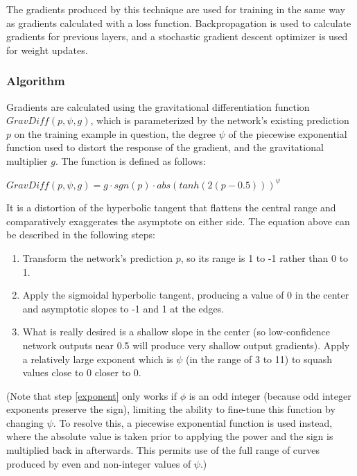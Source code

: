 \documentclass[10pt]{article}
\begin{document}
The gradients produced by this technique are used for training in the same way as gradients calculated with a loss function. Backpropagation is used to calculate gradients for previous layers, and a stochastic gradient descent optimizer \cite{sgd} is used for weight updates.

\subsubsection{Algorithm}

Gradients are calculated using the gravitational differentiation function $GravDiff(p, \psi, g)$, which is parameterized by the network's existing prediction $p$ on the training example in question, the degree $\psi$ of the piecewise exponential function used to distort the response of the gradient, and the gravitational multiplier $g$. The function is defined as follows:

$GravDiff(p, \psi, g) = g \cdot sgn(p) \cdot abs(tanh(2(p - 0.5))) ^ \psi$

It is a distortion of the hyperbolic tangent that flattens the central range and comparatively exaggerates the asymptote on either side. The equation above can be described in the following steps:

\begin{enumerate}
    \item Transform the network's prediction $p$, so its range is 1 to -1 rather than 0 to 1.
    \item Apply the sigmoidal hyperbolic tangent, producing a value of 0 in the center and asymptotic slopes to -1 and 1 at the edges.
    \item \label{exponent} What is really desired is a shallow slope in the center (so low-confidence network outputs near 0.5 will produce very shallow output gradients). Apply a relatively large exponent which is $\psi$ (in the range of 3 to 11) to squash values close to 0 closer to 0.
\end{enumerate}

(Note that step \ref{exponent} only works if $\phi$ is an odd integer (because odd integer exponents preserve the sign), limiting the ability to fine-tune this function by changing $\psi$. To resolve this, a piecewise exponential function is used instead, where the absolute value is taken prior to applying the power and the sign is multiplied back in afterwards. This permits use of the full range of curves produced by even and non-integer values of $\psi$.)
\end{document}
